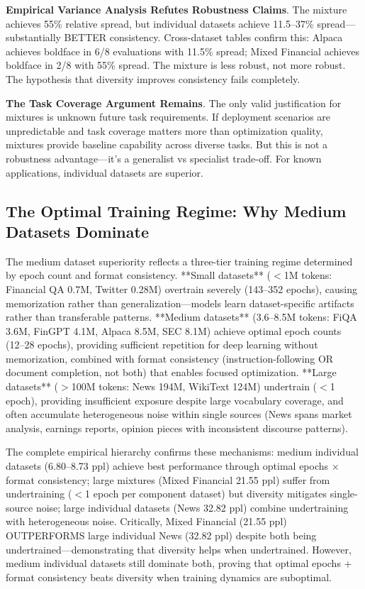 \textbf{Empirical Variance Analysis Refutes Robustness Claims}. The mixture achieves 55\% relative spread, but individual datasets achieve 11.5–37\% spread—substantially BETTER consistency. Cross-dataset tables confirm this: Alpaca achieves boldface in 6/8 evaluations with 11.5\% spread; Mixed Financial achieves boldface in 2/8 with 55\% spread. The mixture is less robust, not more robust. The hypothesis that diversity improves consistency fails completely.

\textbf{The Task Coverage Argument Remains}. The only valid justification for mixtures is unknown future task requirements. If deployment scenarios are unpredictable and task coverage matters more than optimization quality, mixtures provide baseline capability across diverse tasks. But this is not a robustness advantage—it's a generalist vs specialist trade-off. For known applications, individual datasets are superior.

\subsection{The Optimal Training Regime: Why Medium Datasets Dominate}

The medium dataset superiority reflects a three-tier training regime determined by epoch count and format consistency. **Small datasets** ($<$1M tokens: Financial QA 0.7M, Twitter 0.28M) overtrain severely (143–352 epochs), causing memorization rather than generalization—models learn dataset-specific artifacts rather than transferable patterns. **Medium datasets** (3.6–8.5M tokens: FiQA 3.6M, FinGPT 4.1M, Alpaca 8.5M, SEC 8.1M) achieve optimal epoch counts (12–28 epochs), providing sufficient repetition for deep learning without memorization, combined with format consistency (instruction-following OR document completion, not both) that enables focused optimization. **Large datasets** ($>$100M tokens: News 194M, WikiText 124M) undertrain ($<$1 epoch), providing insufficient exposure despite large vocabulary coverage, and often accumulate heterogeneous noise within single sources (News spans market analysis, earnings reports, opinion pieces with inconsistent discourse patterns).

The complete empirical hierarchy confirms these mechanisms: medium individual datasets (6.80–8.73 ppl) achieve best performance through optimal epochs × format consistency; large mixtures (Mixed Financial 21.55 ppl) suffer from undertraining ($<$1 epoch per component dataset) but diversity mitigates single-source noise; large individual datasets (News 32.82 ppl) combine undertraining with heterogeneous noise. Critically, Mixed Financial (21.55 ppl) OUTPERFORMS large individual News (32.82 ppl) despite both being undertrained—demonstrating that diversity helps when undertrained. However, medium individual datasets still dominate both, proving that optimal epochs + format consistency beats diversity when training dynamics are suboptimal.

